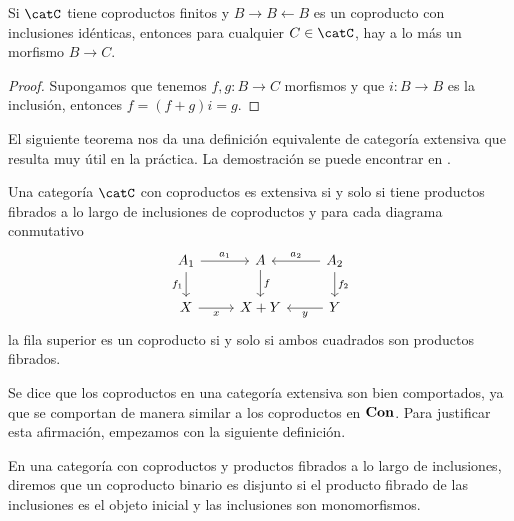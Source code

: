 \begin{proposition}[label=prop:inclusionesidenticas]
  Si $\catC$ tiene coproductos finitos y $B\to B\leftarrow B$ es un coproducto 
  con inclusiones idénticas, entonces para cualquier $C\in\catC$, hay a lo más un morfismo $B\to C$.
\end{proposition}
\begin{proof}
  Supongamos que tenemos $f,g\colon B\to C$ morfismos y que $i\colon B\to B$ es la inclusión, 
  entonces $f=(f+g)i=g$. 
\end{proof}

El siguiente teorema nos da una definición equivalente de categoría extensiva que
resulta muy útil en la práctica. La demostración se puede encontrar en \cite{carboni1993introduction}.

\begin{theorem}[label=thm:condextensiva]
  Una categoría $\catC$ con coproductos es extensiva si y solo si tiene productos
  fibrados a lo largo de inclusiones de coproductos y para cada diagrama conmutativo
  \begin{equation*}
    \begin{tikzcd}
      A_1\ar{r}{a_1}\ar[swap]{d}{f_1} & A\ar{d}{f} & A_2\ar[swap]{l}{a_2}\ar{d}{f_2} \\
      X\ar[swap]{r}{x} & X+Y & Y\ar{l}{y}
    \end{tikzcd}
  \end{equation*}
  la fila superior es un coproducto si y solo si ambos cuadrados son productos fibrados.
\end{theorem}
 
Se dice que los coproductos en una categoría extensiva son bien comportados,
ya que se comportan de manera similar a los coproductos en $\mathbf{Con}$. Para justificar
esta afirmación, empezamos con la siguiente definición.

\begin{definition}
  En una categoría con coproductos y productos fibrados a lo largo de inclusiones, 
  diremos que un coproducto binario es disjunto si el producto fibrado de las inclusiones
  es el objeto inicial y las inclusiones son monomorfismos. 
\end{definition}

